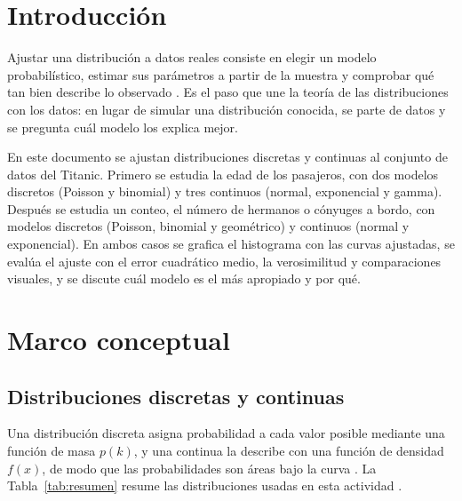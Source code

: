 \documentclass[11pt,letterpaper]{article}
\begin{document}
\portada
\indicegeneral


\section{Introducción}

Ajustar una distribución a datos reales consiste en elegir un modelo probabilístico, estimar sus parámetros a partir de la muestra y comprobar qué tan bien describe lo observado \parencite{tecnm2026_documento_fuente}. Es el paso que une la teoría de las distribuciones con los datos: en lugar de simular una distribución conocida, se parte de datos y se pregunta cuál modelo los explica mejor.

En este documento se ajustan distribuciones discretas y continuas al conjunto de datos del Titanic. Primero se estudia la edad de los pasajeros, con dos modelos discretos (Poisson y binomial) y tres continuos (normal, exponencial y gamma). Después se estudia un conteo, el número de hermanos o cónyuges a bordo, con modelos discretos (Poisson, binomial y geométrico) y continuos (normal y exponencial). En ambos casos se grafica el histograma con las curvas ajustadas, se evalúa el ajuste con el error cuadrático medio, la verosimilitud y comparaciones visuales, y se discute cuál modelo es el más apropiado y por qué.

\section{Marco conceptual}

\subsection{Distribuciones discretas y continuas}

Una distribución discreta asigna probabilidad a cada valor posible mediante una función de masa $p(k)$, y una continua la describe con una función de densidad $f(x)$, de modo que las probabilidades son áreas bajo la curva \parencite{tecnm2026_documento_fuente}. La Tabla~\ref{tab:resumen} resume las distribuciones usadas en esta actividad \parencite{tecnm2026_documento_fuente,rice2006}.
\end{document}
